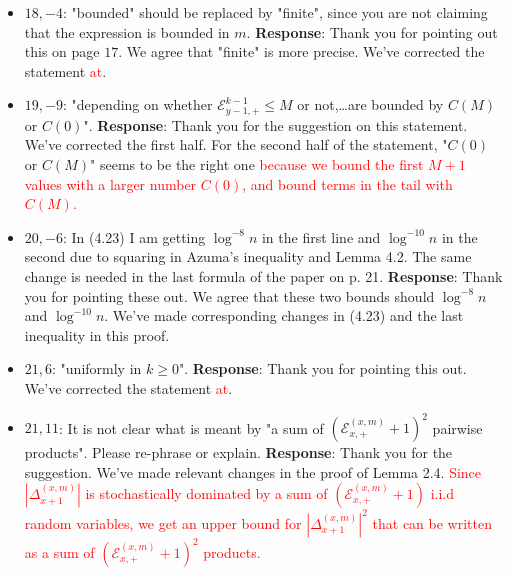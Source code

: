 \documentclass[11pt,a4paper]{article}
\numberwithin{equation}{section}
\newcommand{\abs}[1]{\left\vert #1 \right\vert}
\def\TBF#1{\textcolor{red}{#1}} %
\begin{document}
\begin{itemize}
		\item 
		$18,-4$: "bounded" should be replaced by "finite", since you are not claiming that the expression is bounded in $m$.
		\subitem \textbf{Response}:  Thank you for pointing out this on page $17$. We agree that "finite" is more precise.  We've corrected the statement \TBF{at}. 
		
		\item 
		$19,-9$: "depending on whether $\mathcal{E}^{k-1}_{y-1,+} \leq M$ or not,\dots are bounded by $C(M)$ or $C(0)$".
		\subitem \textbf{Response}: Thank you for the suggestion on this statement. We've corrected the first half. For the second half of the statement, "$C(0)$ or $C(M)$" seems to be the right one \TBF{because we bound the first $M+1$ values with a larger number $C(0)$, and bound terms in the tail with $C(M)$.  }
		
		\item 
		$20,-6$: In (4.23) I am getting $\log^{-8} n$ in the first line and $\log^{-10} n$ in the second due to squaring in Azuma's inequality and Lemma 4.2. The same change is needed in the last formula of the paper on p. 21.
		\subitem \textbf{Response}:  Thank you for pointing these out. We agree that these two bounds should $\log^{-8} n $ and $\log^{-10} n$. We've made corresponding changes in (4.23) and the last inequality in this proof.
		
		\item 
		$21,6$: "uniformly in $k\geq 0$".
		\subitem \textbf{Response}:  Thank you for pointing this out.  We've corrected the statement \TBF{at}. 
		
		\item 
		$21,11$: It is not clear what is meant by "a sum of $\left(\mathcal{E}^{(x,m)}_{x,+} +1 \right)^2$ pairwise products". Please re-phrase or explain.
		\subitem \textbf{Response}: Thank you for the suggestion. We've made relevant changes in the proof of Lemma 2.4. \TBF{Since $\abs{\Delta_{x+1}^{(x,m)}}$ is stochastically dominated by a sum of $\left(\mathcal{E}^{(x,m)}_{x,+} +1\right)$ i.i.d random variables, we get an upper bound for $\abs{\Delta_{x+1}^{(x,m)}}^2$ that can be written as a sum of  $\left(\mathcal{E}^{(x,m)}_{x,+} +1\right)^2$ products. } 
	\end{itemize}
	
	\newpage
\end{document}
